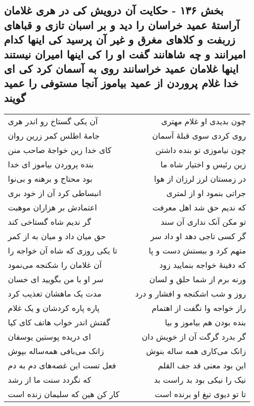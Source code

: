 \begin{center}
\section*{بخش ۱۳۶ - حکایت آن درویش کی در هری غلامان آراستهٔ عمید خراسان را دید و بر اسبان تازی و قباهای زربفت و کلاهای مغرق و غیر آن پرسید کی اینها کدام امیرانند و چه شاهانند گفت او را کی اینها امیران نیستند اینها غلامان عمید خراسانند روی به آسمان  کرد کی ای خدا غلام پروردن از عمید  بیاموز آنجا مستوفی را عمید گویند}
\label{sec:sh136}
\begin{longtable}{l p{0.5cm} r}
آن یکی گستاخ رو اندر هری
&&
چون بدیدی او غلام مهتری
\\
جامهٔ اطلس کمر زرین روان
&&
روی کردی سوی قبلهٔ آسمان
\\
کای خدا زین خواجهٔ صاحب منن
&&
چون نیاموزی تو بنده داشتن
\\
بنده پروردن بیاموز ای خدا
&&
زین رئیس و اختیار شاه ما
\\
بود محتاج و برهنه و بی‌نوا
&&
در زمستان لرز لرزان از هوا
\\
انبساطی کرد آن از خود بری
&&
جراتی بنمود او از لمتری
\\
اعتمادش بر هزاران موهبت
&&
که ندیم حق شد اهل معرفت
\\
گر ندیم شاه گستاخی کند
&&
تو مکن آنک نداری آن سند
\\
حق میان داد و میان به از کمر
&&
گر کسی تاجی دهد او داد سر
\\
تا یکی روزی که شاه آن خواجه را
&&
متهم کرد و ببستش دست و پا
\\
آن غلامان را شکنجه می‌نمود
&&
که دفینهٔ خواجه بنمایید زود
\\
سر او با من بگویید ای خسان
&&
ورنه برم از شما حلق و لسان
\\
مدت یک ماهشان تعذیب کرد
&&
روز و شب اشکنجه و افشار و درد
\\
پاره پاره کردشان و یک غلام
&&
راز خواجه وا نگفت از اهتمام
\\
گفتش اندر خواب هاتف کای کیا
&&
بنده بودن هم بیاموز و بیا
\\
ای دریده پوستین یوسفان
&&
گر بدرد گرگت آن از خویش دان
\\
زانک می‌بافی همه‌ساله بپوش
&&
زانک می‌کاری همه ساله بنوش
\\
فعل تست این غصه‌های دم به دم
&&
این بود معنی قد جف القلم
\\
که نگردد سنت ما از رشد
&&
نیک را نیکی بود بد راست بد
\\
کار کن هین که سلیمان زنده است
&&
تا تو دیوی تیغ او برنده است

\end{longtable}
\end{center}
